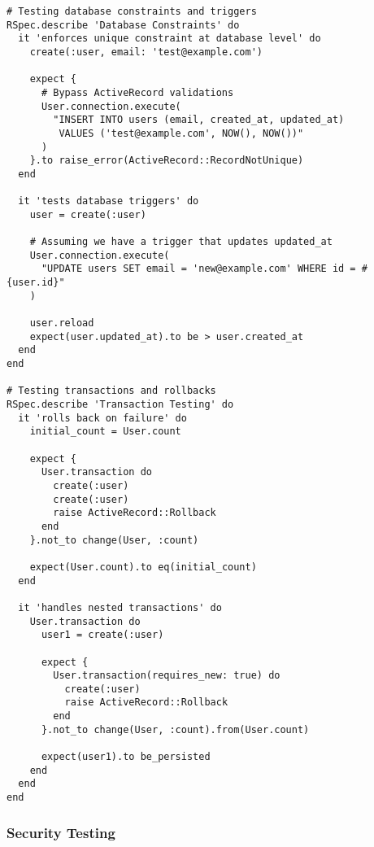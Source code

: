 \documentclass[12pt,a4paper]{article}
\begin{document}
\begin{lstlisting}
# Testing database constraints and triggers
RSpec.describe 'Database Constraints' do
  it 'enforces unique constraint at database level' do
    create(:user, email: 'test@example.com')
    
    expect {
      # Bypass ActiveRecord validations
      User.connection.execute(
        "INSERT INTO users (email, created_at, updated_at) 
         VALUES ('test@example.com', NOW(), NOW())"
      )
    }.to raise_error(ActiveRecord::RecordNotUnique)
  end

  it 'tests database triggers' do
    user = create(:user)
    
    # Assuming we have a trigger that updates updated_at
    User.connection.execute(
      "UPDATE users SET email = 'new@example.com' WHERE id = #{user.id}"
    )
    
    user.reload
    expect(user.updated_at).to be > user.created_at
  end
end

# Testing transactions and rollbacks
RSpec.describe 'Transaction Testing' do
  it 'rolls back on failure' do
    initial_count = User.count
    
    expect {
      User.transaction do
        create(:user)
        create(:user)
        raise ActiveRecord::Rollback
      end
    }.not_to change(User, :count)
    
    expect(User.count).to eq(initial_count)
  end

  it 'handles nested transactions' do
    User.transaction do
      user1 = create(:user)
      
      expect {
        User.transaction(requires_new: true) do
          create(:user)
          raise ActiveRecord::Rollback
        end
      }.not_to change(User, :count).from(User.count)
      
      expect(user1).to be_persisted
    end
  end
end
\end{lstlisting}

\subsubsection{Security Testing}
\end{document}
